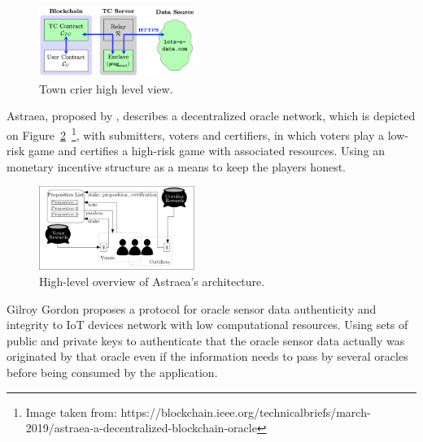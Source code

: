 \documentclass[final,3p,12pt,twocolumn]{elsarticle}
\begin{document}
\begin{figure}[H]
  \begin{center}
    \leavevmode
    \includegraphics[width=0.45\textwidth]{figures/town-crier.png}
    \caption{Town crier high level view.}
    \label{fig:/figures/town-crier}
  \end{center}
\end{figure}





Astraea, proposed by \citet{Adler2018}, describes a decentralized oracle network, which is depicted on Figure~\ref{fig:/figures/astraea}~\footnote{Image taken from: https://blockchain.ieee.org/technicalbriefs/march-2019/astraea-a-decentralized-blockchain-oracle}, with submitters, voters and certifiers, in which voters play a low-risk game and certifies a high-risk game with associated resources. Using an monetary incentive structure as a means to keep the players honest.

\begin{figure}[H]
  \begin{center}
    \leavevmode
    \includegraphics[width=0.45\textwidth]{figures/astraea.jpg}
    \caption{High-level overview of Astraea's architecture.}
    \label{fig:/figures/astraea}
  \end{center}
\end{figure}

Gilroy Gordon \citet{Gordon2017} proposes a protocol for oracle sensor data authenticity and integrity to IoT devices network with low computational resources. Using sets of public and private keys to authenticate that the oracle sensor data actually was originated by that oracle even if the information needs to pass by several oracles before being consumed by the application.
\end{document}
